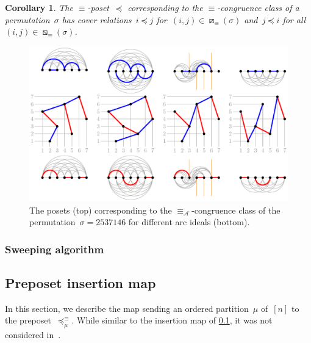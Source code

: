 \documentclass{amsart}
\newtheorem{corollary}[theorem]{Corollary}
\theoremstyle{definition}
\newcommand{\vincent}[1]{\todo[color=blue!30]{#1 \\ \hfill --- V.}}
\newcommand{\arcs}{{\mathcal{A}}} %
\begin{document}
\begin{corollary}
\label{coro:insertionMap}
The $\equiv$-poset~$\preccurlyeq$ corresponding to the $\equiv$-congruence class of a permutation~$\sigma$ has cover relations~$i \preccurlyeq j$ for~$(i,j) \in \boxslash_\equiv(\sigma)$ and~$j \preccurlyeq i$ for all~$(i,j) \in \boxbslash_\equiv(\sigma)$.
\end{corollary}

\begin{figure}
	\capstart
	\centerline{\includegraphics[scale=.85]{arcDiagramsQuotients}}
	\caption{The posets (top) corresponding to the $\equiv_\arcs$-congruence class of the permutation~$\sigma = 2537146$ for different arc ideals (bottom).}
	\label{fig:arcDiagramsQuotients}
\end{figure}

\subsubsection{Sweeping algorithm}
\vincent{todo}


\subsection{Preposet insertion map}
\label{subsec:insertionMap}

In this section, we describe the map sending an ordered partition~$\mu$ of~$[n]$ to the preposet~$\preccurlyeq_\mu^\equiv$.
While similar to the insertion map of \cref{subsec:insertionMap}, it was not considered in~\cite{Pilaud-arcDiagramAlgebra}.
\end{document}
